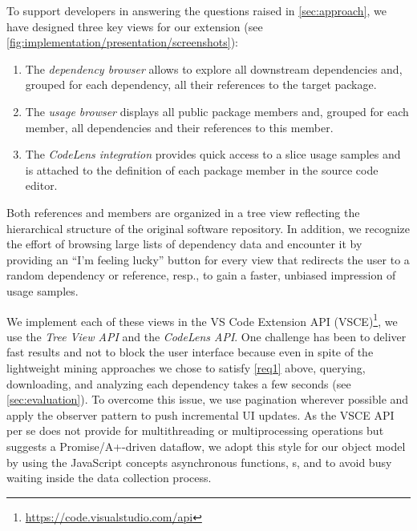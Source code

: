 To support developers in answering the questions raised in \cref{sec:approach}, we have designed three key views for our extension (see \cref{fig:implementation/presentation/screenshots}):

\begin{enumerate}[label=(\roman*)]
	\item The \emph{dependency browser} allows to explore all downstream dependencies and, grouped for each dependency, all their references to the target package.
	\item The \emph{usage browser} displays all public package members and, grouped for each member, all dependencies and their references to this member.
	\item The \emph{CodeLens integration} provides quick access to a slice usage samples and is attached to the definition of each package member in the source code editor.
\end{enumerate}

Both references and members are organized in a tree view reflecting the hierarchical structure of the original software repository.
In addition, we recognize the effort of browsing large lists of dependency data and encounter it by providing an ``I'm feeling lucky'' button for every view that redirects the user to a random dependency or reference, resp., to gain a faster, unbiased impression of usage samples.

We implement each of these views in the VS Code Extension API (VSCE)\footnote{\url{https://code.visualstudio.com/api}}, we use the \emph{Tree View API} and the \emph{CodeLens API}.
One challenge has been to deliver fast results and not to block the user interface because even in spite of the lightweight mining approaches we chose to satisfy \cref{req1} above, querying, downloading, and analyzing each dependency takes a few seconds (see \cref{sec:evaluation}).
To overcome this issue, we use pagination wherever possible and apply the observer pattern to push incremental UI updates.
As the VSCE API per se does not provide for multithreading or multiprocessing operations but suggests a Promise/A+-driven dataflow, we adopt this style for our object model by using the JavaScript concepts asynchronous functions, s, and  to avoid busy waiting inside the data collection process.
